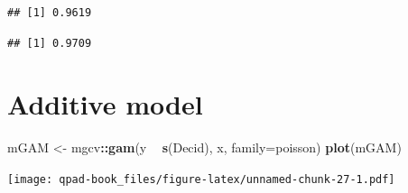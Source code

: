 \documentclass[12pt,]{book}
\newenvironment{Shaded}{\begin{snugshade}}{\end{snugshade}}
\newcommand{\DataTypeTok}[1]{\textcolor[rgb]{0.13,0.29,0.53}{#1}}
\newcommand{\DecValTok}[1]{\textcolor[rgb]{0.00,0.00,0.81}{#1}}
\newcommand{\FloatTok}[1]{\textcolor[rgb]{0.00,0.00,0.81}{#1}}
\newcommand{\KeywordTok}[1]{\textcolor[rgb]{0.13,0.29,0.53}{\textbf{#1}}}
\newcommand{\NormalTok}[1]{#1}
\newcommand{\OperatorTok}[1]{\textcolor[rgb]{0.81,0.36,0.00}{\textbf{#1}}}
\newcommand{\StringTok}[1]{\textcolor[rgb]{0.31,0.60,0.02}{#1}}
\begin{document}
\begin{verbatim}
## [1] 0.9619
\end{verbatim}

\begin{Shaded}
\end{Shaded}

\begin{verbatim}
## [1] 0.9709
\end{verbatim}

\hypertarget{additive-model}{%
\section{Additive model}\label{additive-model}}

\begin{Shaded}
\begin{Highlighting}[]
\NormalTok{mGAM <-}\StringTok{ }\NormalTok{mgcv}\OperatorTok{::}\KeywordTok{gam}\NormalTok{(y }\OperatorTok{~}\StringTok{ }\KeywordTok{s}\NormalTok{(Decid), x, }\DataTypeTok{family=}\NormalTok{poisson)}
\KeywordTok{plot}\NormalTok{(mGAM)}
\end{Highlighting}
\end{Shaded}

\texttt{[image: qpad-book\_files/figure-latex/unnamed-chunk-27-1.pdf]}
\end{document}
